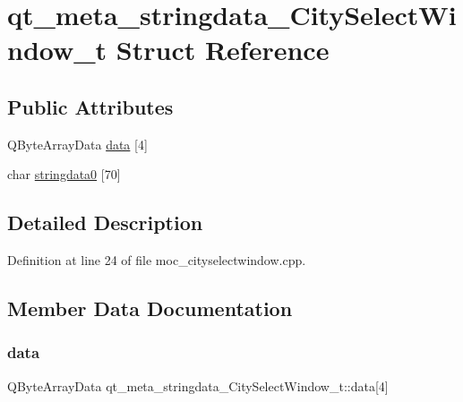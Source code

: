 \hypertarget{structqt__meta__stringdata___city_select_window__t}{}\section{qt\+\_\+meta\+\_\+stringdata\+\_\+\+City\+Select\+Window\+\_\+t Struct Reference}
\label{structqt__meta__stringdata___city_select_window__t}
\subsection*{Public Attributes}
\begin{DoxyCompactItemize}
\item 
Q\+Byte\+Array\+Data \mbox{\hyperlink{structqt__meta__stringdata___city_select_window__t_a074c084d258320c4c69d13a07febd2ab}{data}} \mbox{[}4\mbox{]}
\item 
char \mbox{\hyperlink{structqt__meta__stringdata___city_select_window__t_a87be28223e0ce0f734ed224649fef90e}{stringdata0}} \mbox{[}70\mbox{]}
\end{DoxyCompactItemize}


\subsection{Detailed Description}


Definition at line 24 of file moc\+\_\+cityselectwindow.\+cpp.



\subsection{Member Data Documentation}
\mbox{\label{structqt__meta__stringdata___city_select_window__t_a074c084d258320c4c69d13a07febd2ab}} 
\subsubsection{\texorpdfstring{data}{data}}
{\footnotesize\ttfamily Q\+Byte\+Array\+Data qt\+\_\+meta\+\_\+stringdata\+\_\+\+City\+Select\+Window\+\_\+t\+::data\mbox{[}4\mbox{]}}



